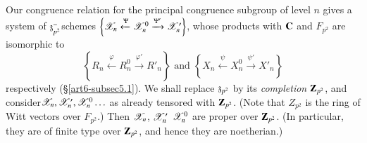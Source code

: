 \subsection{}\label{art6-subsec6.1}
Our congruence relation for the principal congruence subgroup of level $n$ gives a system of $\mathfrak{z}_{p^2}^-$schemes $\left\{\mathscr{X}_n \xleftarrow{\Psi} \mathscr{X}^0_n  \xrightarrow{\Psi'} \mathscr{X}'_n\right\}$, whose products with $\mathbf{C}$ and $F_{p^2}$ are isomorphic to 
$$
\left\{R_n  \xleftarrow{\varphi} R^0_n \xrightarrow{\varphi'} R'_n \right\} \text{ and } \left\{ X_n \xleftarrow{\psi} X^0_n \xrightarrow{\psi'} X'_n\right\}
$$
respectively (\S \ref{art6-subsec5.1}). We shall replace $\mathfrak{z}_{p^2}$ by its \textit{completion} $\mathbf{Z}_{p^2}$, and consider\pageoriginale $\mathscr{X}_n, \mathscr{X}'_n, \mathscr{X}^0_n\ldots$ as already tensored with $\mathbf{Z}_{p^2}$. (Note that $Z_{p^2}$ is the ring of Witt vectors over $F_{p^2}$.) Then $\mathscr{X}_n$, $\mathscr{X}'_n$ $\mathscr{X}^0_n$ are proper over $\mathbf{Z}_{p^2}$. (In particular, they are of finite type over $\mathbf{Z}_{p^2}$, and hence they are noetherian.)

